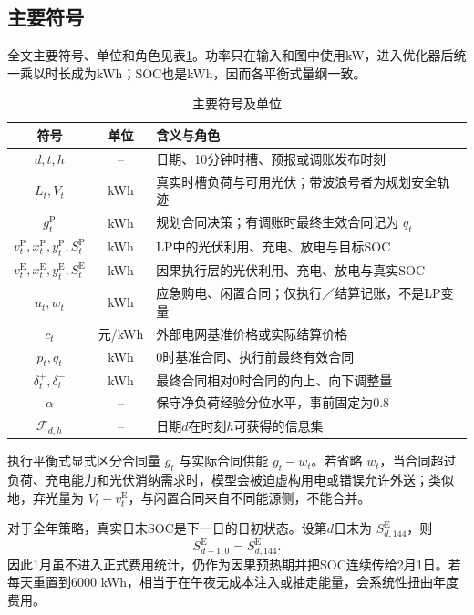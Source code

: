 \subsection{主要符号}

全文主要符号、单位和角色见表\ref{tab:symbols}。功率只在输入和图中使用kW，进入优化器后统一乘以时长成为kWh；SOC也是kWh，因而各平衡式量纲一致。

\begin{table}[H]
\centering
\caption{主要符号及单位}
\label{tab:symbols}
\begin{tabularx}{\textwidth}{c c X}
\toprule
符号 & 单位 & 含义与角色\\
\midrule
$d,t,h$ & -- & 日期、10分钟时槽、预报或调账发布时刻\\
$L_t,V_t$ & kWh & 真实时槽负荷与可用光伏；带波浪号者为规划安全轨迹\\
$g_t^{\mathrm P}$ & kWh & 规划合同决策；有调账时最终生效合同记为 $q_t$\\
$v_t^{\mathrm P},x_t^{\mathrm P},y_t^{\mathrm P},S_t^{\mathrm P}$ & kWh & LP中的光伏利用、充电、放电与目标SOC\\
$v_t^{\mathrm E},x_t^{\mathrm E},y_t^{\mathrm E},S_t^{\mathrm E}$ & kWh & 因果执行层的光伏利用、充电、放电与真实SOC\\
$u_t,w_t$ & kWh & 应急购电、闲置合同；仅执行／结算记账，不是LP变量\\
$c_t$ & 元/kWh & 外部电网基准价格或实际结算价格\\
$p_t,q_t$ & kWh & 0时基准合同、执行前最终有效合同\\
$\delta_t^+,\delta_t^-$ & kWh & 最终合同相对0时合同的向上、向下调整量\\
$\alpha$ & -- & 保守净负荷经验分位水平，事前固定为0.8\\
$\mathcal F_{d,h}$ & -- & 日期$d$在时刻$h$可获得的信息集\\
\bottomrule
\end{tabularx}
\end{table}

执行平衡式显式区分合同量 $g_t$ 与实际合同供能 $g_t-w_t$。若省略 $w_t$，当合同超过负荷、充电能力和光伏消纳需求时，模型会被迫虚构用电或错误允许外送；类似地，弃光量为 $V_t-v_t^{\mathrm E}$，与闲置合同来自不同能源侧，不能合并。

对于全年策略，真实日末SOC是下一日的日初状态。设第$d$日末为 $S_{d,144}^{\mathrm E}$，则
\begin{equation}
 S_{d+1,0}^{\mathrm E}=S_{d,144}^{\mathrm E}.
 \label{eq:day-link}
\end{equation}
因此1月虽不进入正式费用统计，仍作为因果预热期并把SOC连续传给2月1日。若每天重置到6000 kWh，相当于在午夜无成本注入或抽走能量，会系统性扭曲年度费用。
